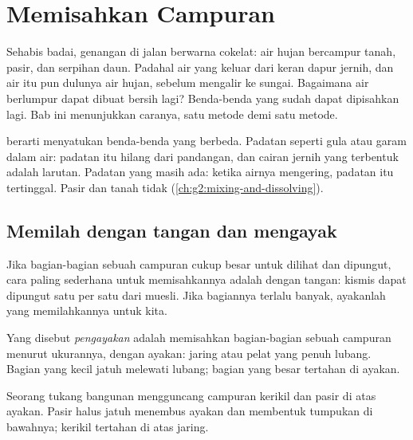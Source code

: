 \chapter{Memisahkan Campuran}\label{ch:g3:separating-mixtures}

Sehabis badai, genangan di jalan berwarna cokelat: air hujan bercampur
tanah, pasir, dan serpihan daun. Padahal air yang keluar dari keran
dapur jernih, dan air itu pun dulunya air hujan, sebelum mengalir ke
sungai. Bagaimana air berlumpur dapat dibuat bersih lagi? Benda-benda
yang sudah  dapat dipisahkan lagi. Bab ini menunjukkan caranya,
satu metode demi satu metode.

\begin{recall}
 berarti menyatukan benda-benda yang berbeda. Padatan seperti
gula atau garam  dalam air: padatan itu hilang dari pandangan, dan
cairan jernih yang terbentuk adalah larutan. Padatan yang  masih
ada: ketika airnya mengering, padatan itu tertinggal. Pasir dan tanah
tidak  (\cref{ch:g2:mixing-and-dissolving}).
\end{recall}

\section{Memilah dengan tangan dan mengayak}

Jika bagian-bagian sebuah campuran cukup besar untuk dilihat dan
dipungut, cara paling sederhana untuk memisahkannya adalah dengan
tangan: kismis dapat dipungut satu per satu dari muesli. Jika bagiannya
terlalu banyak, ayakanlah yang memilahkannya untuk kita.

\begin{definition}[Pengayakan]\label{def:g3:separating-mixtures:sieve}
Yang disebut \emph{pengayakan} adalah memisahkan
bagian-bagian sebuah campuran menurut ukurannya, dengan ayakan: jaring
atau pelat yang penuh lubang. Bagian yang kecil jatuh melewati lubang;
bagian yang besar tertahan di ayakan.
\end{definition}

\begin{example}\label{ex:g3:separating-mixtures:gravel}
Seorang tukang bangunan mengguncang campuran kerikil dan pasir di atas
ayakan. Pasir halus jatuh menembus ayakan dan membentuk tumpukan di
bawahnya; kerikil tertahan di atas jaring.
\end{example}

